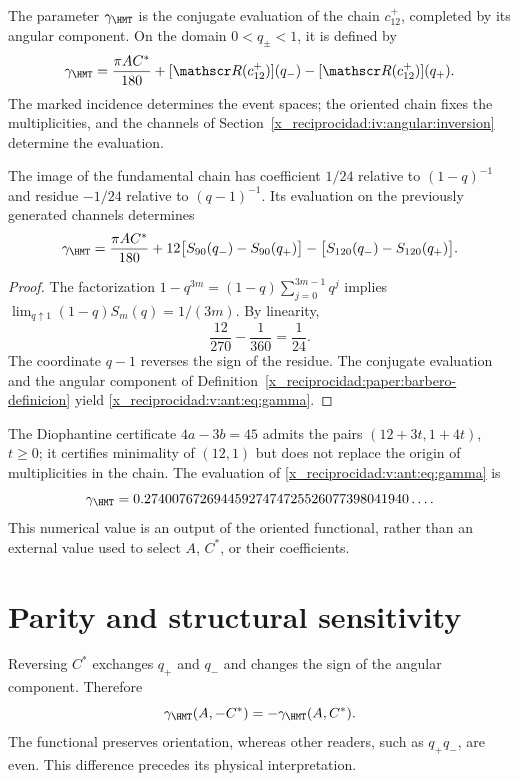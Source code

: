 \begin{definition}
\label{x_reciprocidad:paper:barbero-definicion}
The parameter \(\gamma_{\HMT}\) is the conjugate evaluation of the chain
\(c_{12}^{+}\), completed by its angular component. On the domain
\(0<q_\pm<1\), it is defined by
\[
\gamma_{\HMT}=\frac{\pi AC^*}{180}
+[\mathscr R(c_{12}^{+})](q_-)-[\mathscr R(c_{12}^{+})](q_+).
\]
The marked incidence determines the event spaces; the oriented
chain fixes the multiplicities, and the channels of
Section~\ref{x_reciprocidad:iv:angular:inversion} determine the evaluation.
\end{definition}

\begin{theorem}
The image of the fundamental chain has coefficient $1/24$ relative to $(1-q)^{-1}$ and residue $-1/24$ relative to $(q-1)^{-1}$. Its evaluation on the previously generated channels determines
\begin{equation}
\gamma_{\HMT}=
\frac{\pi AC^*}{180}
+12\bigl[S_{90}(q_-)-S_{90}(q_+)\bigr]
-\bigl[S_{120}(q_-)-S_{120}(q_+)\bigr].
\label{x_reciprocidad:v:ant:eq:gamma}
\end{equation}
\end{theorem}
\begin{proof}
The factorization $1-q^{3m}=(1-q)\sum_{j=0}^{3m-1}q^j$ implies
$\lim_{q\uparrow1}(1-q)S_m(q)=1/(3m)$. By linearity,
\[
\frac{12}{270}-\frac1{360}=\frac1{24}.
\]
The coordinate $q-1$ reverses the sign of the residue.
The conjugate evaluation and the angular component of Definition~\ref{x_reciprocidad:paper:barbero-definicion}
yield \eqref{x_reciprocidad:v:ant:eq:gamma}.
\end{proof}

The Diophantine certificate $4a-3b=45$ admits the pairs $(12+3t,1+4t)$, $t\ge0$; it certifies minimality of $(12,1)$ but does not replace the origin of multiplicities in the chain. The evaluation of \eqref{x_reciprocidad:v:ant:eq:gamma} is
\[
\gamma_{\HMT}
=0.27400767269445927474725526077398041940\ldots.
\]
This numerical value is an output of the oriented functional, rather than an external value
used to select $A$, $C^*$, or their coefficients.

\section{Parity and structural sensitivity}
Reversing $C^*$ exchanges $q_+$ and $q_-$ and changes the sign of the angular component. Therefore
\[
\gamma_{\HMT}(A,-C^*)=-\gamma_{\HMT}(A,C^*).
\]
The functional preserves orientation, whereas other readers, such as $q_+q_-$, are even. This difference precedes its physical interpretation.


